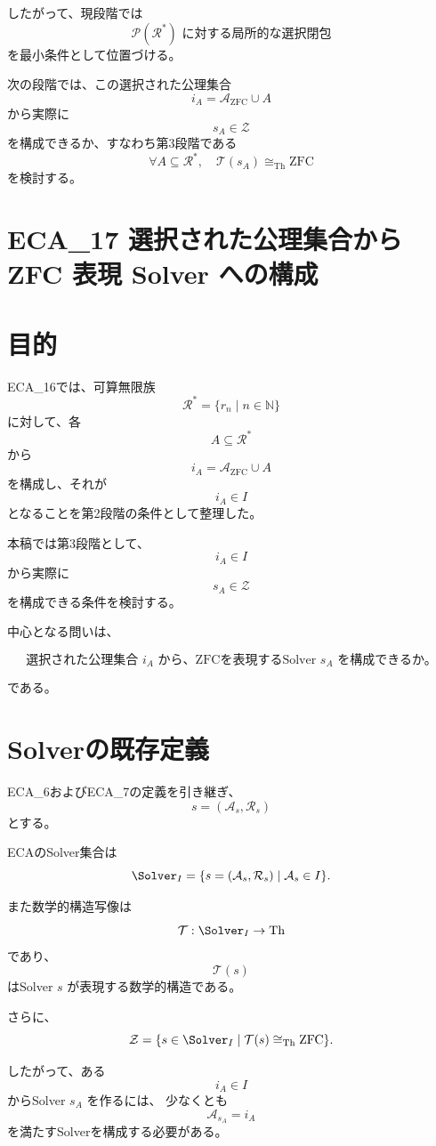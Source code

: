 \documentclass[11pt,a4paper]{article}
\begin{document}
したがって、現段階では
\[
\mathcal{P}(\mathcal{R}^*)\text{ に対する局所的な選択閉包}
\]
を最小条件として位置づける。

次の段階では、この選択された公理集合
\[
i_A=\mathcal{A}_{\mathrm{ZFC}}\cup A
\]
から実際に
\[
s_A\in\mathcal{Z}
\]
を構成できるか、すなわち第3段階である
\[
\boxed{
\forall A\subseteq\mathcal{R}^*,
\quad
\mathcal{T}(s_A)\cong_{\mathrm{Th}}\mathrm{ZFC}
}
\]
を検討する。






\section{ECA\_17 選択された公理集合から ZFC 表現 Solver への構成}


\section{目的}

ECA\_16では、可算無限族
\[
\mathcal{R}^*=\{r_n\mid n\in\mathbb N\}
\]
に対して、各
\[
A\subseteq\mathcal{R}^*
\]
から
\[
i_A=\mathcal{A}_{\mathrm{ZFC}}\cup A
\]
を構成し、それが
\[
i_A\in I
\]
となることを第2段階の条件として整理した。

本稿では第3段階として、
\[
i_A\in I
\]
から実際に
\[
s_A\in\mathcal{Z}
\]
を構成できる条件を検討する。

中心となる問いは、

\[
\boxed{
\text{選択された公理集合 }i_A
\text{ から、ZFCを表現するSolver }s_A\text{ を構成できるか。}
}
\]

である。

\section{Solverの既存定義}

ECA\_6およびECA\_7の定義を引き継ぎ、
\[
s=(\mathcal{A}_s,\mathcal{R}_s)
\]
とする。

ECAのSolver集合は
\[
\Solver_I
=
\{s=(\mathcal{A}_s,\mathcal{R}_s)\mid
\mathcal{A}_s\in I\}.
\]

また数学的構造写像は
\[
\mathcal{T}:\Solver_I\to\mathrm{Th}
\]
であり、
\[
\mathcal{T}(s)
\]
はSolver $s$ が表現する数学的構造である。

さらに、
\[
\mathcal{Z}
=
\{s\in\Solver_I\mid
\mathcal{T}(s)\cong_{\mathrm{Th}}\mathrm{ZFC}\}.
\]

したがって、ある
\[
i_A\in I
\]
からSolver $s_A$ を作るには、
少なくとも
\[
\mathcal{A}_{s_A}=i_A
\]
を満たすSolverを構成する必要がある。
\end{document}
